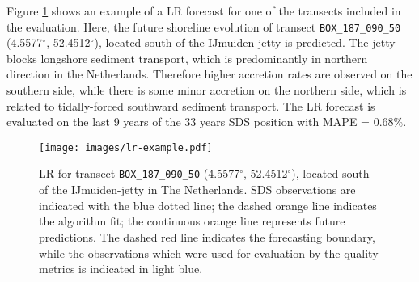 \documentclass[format=sigconf, review=false, screen=true]{acmart}
\begin{document}



Figure \ref{fig:lr-example} shows an example of a LR forecast for one of the transects included in the evaluation. Here, the future shoreline evolution of transect \texttt{BOX\_187\_090\_50} (4.5577$^\circ$, 52.4512$^\circ$), located south of the IJmuiden jetty is predicted. The jetty blocks longshore sediment transport, which is predominantly in northern direction in the Netherlands. Therefore higher accretion rates are observed on the southern side, while there is some minor accretion on the northern side, which is related to tidally-forced southward sediment transport. The LR forecast is evaluated on the last 9 years of the 33 years SDS position with MAPE = $0.68\%$.  

\begin{figure}[h]
	\centering
	\texttt{[image: images/lr-example.pdf]}
	\caption{LR for transect \texttt{BOX\_187\_090\_50} (4.5577$^\circ$, 52.4512$^\circ$), located south of the IJmuiden-jetty in The Netherlands. SDS observations are indicated with the blue dotted line; the dashed orange line indicates the algorithm fit; the continuous orange line represents future predictions. The dashed red line indicates the forecasting boundary, while the observations which were used for evaluation by the quality metrics is indicated in light blue.}
	\label{fig:lr-example}
\end{figure}
\end{document}
